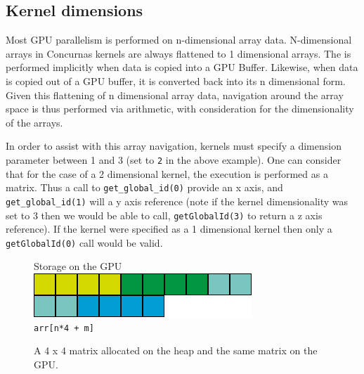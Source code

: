 \documentclass[conc-doc]{subfiles}
\begin{document}
\subsection{Kernel dimensions}
Most GPU parallelism is performed on n-dimensional array data. N-dimensional arrays in Concurnas kernels are always flattened to 1 dimensional arrays. The is performed implicitly when data is copied into a GPU Buffer. Likewise, when data is copied out of a GPU buffer, it is converted back into its n dimensional form. Given this flattening of n dimensional array data, navigation around the array space is thus performed via arithmetic, with consideration for the dimensionality of the arrays.

In order to assist with this array navigation, kernels must specify a dimension parameter between 1 and 3 (set to \lstinline{2} in the above example). One can consider that for the case of a 2 dimensional kernel, the execution is performed as a matrix. Thus a call to \lstinline{get_global_id(0)} provide an x axis, and \lstinline{get_global_id(1)} will a y axis reference (note if the kernel dimensionality was set to 3 then we would be able to call, \lstinline{getGlobalId(3)} to return a z axis reference). If the kernel were specified as a 1 dimensional kernel then only a \lstinline{getGlobalId(0)} call would be valid.


\begin{figure}[H]
	{
		Storage on the GPU\\
		\includegraphics[width=.45\textwidth]{images/gpu-heap2.png}\\
		\lstinline{arr[n*4 + m]}
	}
	\caption{A 4 x 4 matrix allocated on the heap and the same matrix on the GPU.}
	\label{fig:memAllocation}
\end{figure}
\end{document}
